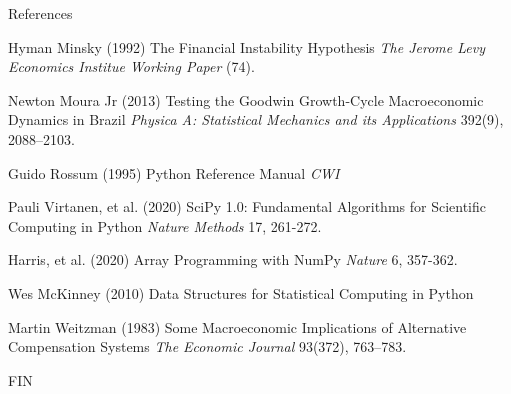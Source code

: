\documentclass{beamer}
\begin{document}
\begin{frame}[allowframebreaks]{References}
{\begin{thebibliography}{99}
 Hyman Minsky (1992)
\newblock The Financial Instability Hypothesis
\newblock \emph{The Jerome Levy Economics Institue Working Paper} (74).

 Newton Moura Jr (2013)
\newblock Testing the Goodwin Growth-Cycle Macroeconomic Dynamics in Brazil
\newblock \emph{Physica A: Statistical Mechanics and its Applications} 392(9), 2088–2103.

 Guido Rossum (1995)
\newblock Python Reference Manual
\newblock \emph{CWI}

 Pauli Virtanen, et al. (2020)
\newblock SciPy 1.0: Fundamental Algorithms for Scientific Computing in Python
\newblock \emph{Nature Methods} 17, 261-272.

 Harris, et al. (2020)
\newblock Array Programming with NumPy
\newblock \emph{Nature} 6, 357-362.

 Wes McKinney (2010)
\newblock Data Structures for Statistical Computing in Python

 Martin Weitzman (1983)
\newblock Some  Macroeconomic  Implications  of  Alternative  Compensation Systems
\newblock \emph{The Economic Journal } 93(372), 763–783.
\normalsize

\end{thebibliography}
}
\end{frame}


\begin{frame}
\Huge{\centerline{FIN}}
\end{frame}

\end{document}

